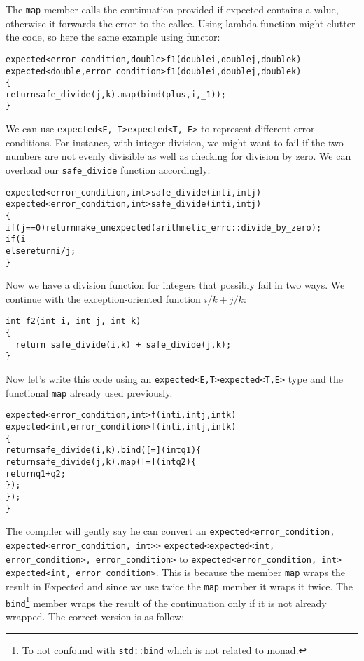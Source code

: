 \documentclass[a4paper,10pt]{article}
\newcommand{\cpp}[1]{\lstinline{#1}}
\newcommand{\suppress}[1]{\colorbox{suppress_color}{#1}}
\newcommand{\update}[1]{\colorbox{update_color}{#1}}
\begin{document}
The \cpp{map} member calls the continuation provided if expected contains a value, otherwise it forwards the error to the callee. Using lambda function might clutter the code, so here the same example using functor:

\begin{alltt}
\suppress{expected<error_condition, double> f1(double i, double j, double k)}
\update{expected<double, error_condition> f1(double i, double j, double k)}
\{
  return safe_divide(j, k).map(bind(plus, i, _1));
\}
\end{alltt}

We can use \suppress{\cpp{expected<E, T>}}\update{\cpp{expected<T, E>}} to represent different error conditions. For instance, with integer division, we might want to fail if the two numbers are not evenly divisible as well as checking for division by zero. We can overload our \cpp{safe_divide} function accordingly:

\begin{alltt}
\suppress{expected<error_condition, int> safe_divide(int i, int j)}
\update{expected<error_condition, int> safe_divide(int i, int j)}
\{
  if (j == 0) return make_unexpected(arithmetic_errc::divide_by_zero); 
  if (i%j != 0) return make_unexpected(arithmetic_errc::not_integer_division);
  else return i / j;
\}
\end{alltt}

Now we have a division function for integers that possibly fail in two ways. We continue with the exception-oriented function $i/k + j/k$:

\begin{lstlisting}
int f2(int i, int j, int k)
{
  return safe_divide(i,k) + safe_divide(j,k);
}
\end{lstlisting}

\noindent
Now let's write this code using an \suppress{\cpp{expected<E,T>}}\update{\cpp{expected<T,E>}} type and the functional \cpp{map} already used previously.

\begin{alltt}
\suppress{expected<error_condition, int> f(int i, int j, int k)}
\update{expected<int,error_condition> f(int i, int j, int k)}
\{
  return safe_divide(i, k).bind([=](int q1) \{
      return safe_divide(j,k).map([=](int q2) \{
        return q1+q2;
      \});
    \});
\}
\end{alltt}

The compiler will gently say he can convert an \suppress{\cpp{expected<error_condition, expected<error_condition, int>>}} \update{\cpp{expected<expected<int, error_condition>, error_condition>}} to \suppress{\cpp{expected<error_condition, int>}} \\
\update{\cpp{expected<int, error_condition>}}. This is because the member \cpp{map} wraps the result in Expected and since we use twice the \cpp{map} member it wraps it twice. The \cpp{bind}\footnote{To not confound with \cpp{std::bind} which is not related to monad.} member wraps the result of the continuation only if it is not already wrapped. The correct version is as follow:
\end{document}
